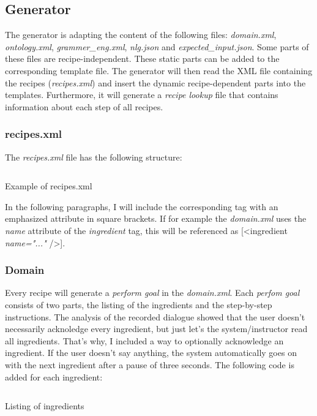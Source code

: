 \documentclass[
	11pt, %
]{fphw}
\newenvironment{code}
    {\captionsetup{
        type=listing,
        skip=2pt,
        belowskip=15pt
        }}
    {}
\begin{document}
\subsection*{Generator}
The generator is adapting the content of the following files: \emph{domain.xml}, \emph{ontology.xml}, \emph{grammer\_eng.xml}, \emph{nlg.json} and \emph{expected\_input.json}. Some parts of these files are recipe-independent. These static parts can be added to the corresponding template file. The generator will then read the XML file containing the recipes (\emph{recipes.xml}) and insert the dynamic recipe-dependent parts into the templates. Furthermore, it will generate a \emph{recipe lookup} file that contains information about each step of all recipes.

\subsubsection*{recipes.xml}
The \emph{recipes.xml} file has the following structure:

\begin{code}
    \inputminted{xml}{includes/recipes.xml}
    \caption{Example of recipes.xml}
\end{code}

In the following paragraphs, I will include the corresponding tag with an emphasized attribute in square brackets. If for example the \emph{domain.xml} uses the \emph{name} attribute of the \emph{ingredient} tag, this will be referenced as [<ingredient \emph{name="..."} />].

\subsubsection*{Domain}
Every recipe will generate a \emph{perform goal} in the \emph{domain.xml}. Each \emph{perfom goal} consists of two parts, the listing of the ingredients and the step-by-step instructions. The analysis of the recorded dialogue showed that the user doesn't necessarily acknoledge every ingredient, but just let's the system/instructor read all ingredients. That's why, I included a way to optionally acknowledge an ingredient. If the user doesn't say anything, the system automatically goes on with the next ingredient after a pause of three seconds. The following code is added for each ingredient:

\begin{code}
    \inputminted{xml}{includes/ingredients_listing.xml}
    \caption{Listing of ingredients}
\end{code}
\end{document}
